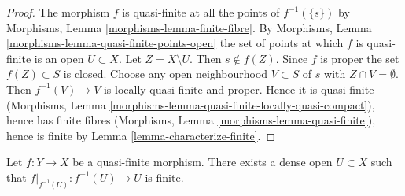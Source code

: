 \begin{proof}
The morphism $f$ is quasi-finite at all the points of $f^{-1}(\{s\})$
by Morphisms, Lemma \ref{morphisms-lemma-finite-fibre}.
By Morphisms, Lemma \ref{morphisms-lemma-quasi-finite-points-open} the
set of points at which $f$ is quasi-finite is an open $U \subset X$.
Let $Z = X \setminus U$. Then $s \not \in f(Z)$. Since $f$ is proper
the set $f(Z) \subset S$ is closed. Choose any open neighbourhood
$V \subset S$ of $s$ with $Z \cap V = \emptyset$. Then
$f^{-1}(V) \to V$ is locally quasi-finite and proper.
Hence it is quasi-finite
(Morphisms, Lemma \ref{morphisms-lemma-quasi-finite-locally-quasi-compact}),
hence has finite fibres
(Morphisms, Lemma \ref{morphisms-lemma-quasi-finite}), hence
is finite by Lemma \ref{lemma-characterize-finite}.
\end{proof}

\begin{lemma}
\label{lemma-quasi-finite-finite-over-dense-open}
Let $f : Y \to X$ be a quasi-finite morphism.
There exists a dense open $U \subset X$ such that
$f|_{f^{-1}(U)} : f^{-1}(U) \to U$ is finite.
\end{lemma}

